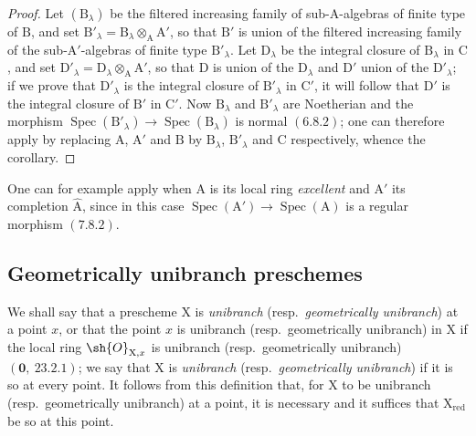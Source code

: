 \begin{proof}
Let $(\mathrm{B}_\lambda)$ be the filtered increasing family of sub-$\mathrm{A}$-algebras of finite type of $\mathrm{B}$, and
set $\mathrm{B}'_\lambda=\mathrm{B}_\lambda\otimes_\mathrm{A}\mathrm{A}'$, so that $\mathrm{B}'$ is union of the filtered increasing family of the
sub-$\mathrm{A}'$-algebras of finite type $\mathrm{B}'_\lambda$. Let $\mathrm{D}_\lambda$ be the integral closure of $\mathrm{B}_\lambda$ in $\mathrm{C}$, and set
$\mathrm{D}'_\lambda=\mathrm{D}_\lambda\otimes_\mathrm{A}\mathrm{A}'$, so that $\mathrm{D}$ is union of the $\mathrm{D}_\lambda$ and $\mathrm{D}'$ union of the $\mathrm{D}'_\lambda$; if we prove
that $\mathrm{D}'_\lambda$ is the integral closure of $\mathrm{B}'_\lambda$ in $\mathrm{C}'$, it will follow that $\mathrm{D}'$ is the integral
closure of $\mathrm{B}'$ in $\mathrm{C}'$. Now $\mathrm{B}_\lambda$ and $\mathrm{B}'_\lambda$ are Noetherian and the morphism $\operatorname{Spec}(\mathrm{B}'_\lambda)\to\operatorname{Spec}(\mathrm{B}_\lambda)$
is normal $(6.8.2)$; one can therefore apply  by replacing $\mathrm{A}$, $\mathrm{A}'$ and $\mathrm{B}$ by $\mathrm{B}_\lambda$,
$\mathrm{B}'_\lambda$ and $\mathrm{C}$ respectively, whence the corollary.
\end{proof}

One can for example apply  when $\mathrm{A}$ is its local ring \emph{excellent}
and $\mathrm{A}'$ its completion $\widehat{\mathrm{A}}$, since in this case $\operatorname{Spec}(\mathrm{A}')\to\operatorname{Spec}(\mathrm{A})$ is a regular
morphism $(7.8.2)$.

\subsection{Geometrically unibranch preschemes}
\label{subsection:IV.6.15}

\begin{env}[6.15.1]
\label{IV.6.15.1}
We shall say that a prescheme $\mathrm{X}$ is \emph{unibranch} (resp.\ \emph{geometrically
unibranch}) at a point $x$, or that the point $x$ is unibranch (resp.\ geometrically unibranch)
in $\mathrm{X}$ if the local ring $\sh{O}_{\mathrm{X},x}$ is unibranch (resp.\ geometrically unibranch) $(\mathbf{0},~23.2.1)$;
we say that $\mathrm{X}$ is \emph{unibranch} (resp.\ \emph{geometrically unibranch}) if it is so at every point. It
follows from this definition that, for $\mathrm{X}$ to be unibranch (resp.\ geometrically
unibranch) at a point, it is necessary and it suffices that $\mathrm{X}_{\mathrm{red}}$ be so at this point.
\end{env}

